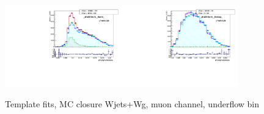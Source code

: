 \begin{figure}[htb]
  \begin{center}
   \includegraphics[width=0.45\textwidth]{../figs/figs_v11/MUON_WGamma/MCclosureWjetsPlusWg/c_TEMPL_SIHIH_UNblind__phoEt10to15__Barrel__RooFit_MCclosure.pdf}\includegraphics[width=0.45\textwidth]{../figs/figs_v11/MUON_WGamma/MCclosureWjetsPlusWg/c_TEMPL_SIHIH_UNblind__phoEt10to15__Endcap__RooFit_MCclosure.pdf}\\
  \label{fig:templateFits_MCclosureWjetsPlusWg_SIHIH_MUON_0}
  \caption{Template fits, MC closure Wjets+Wg, muon channel, underflow bin}
  \end{center}
\end{figure}

\

